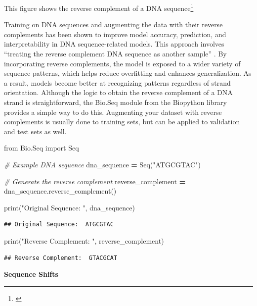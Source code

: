 \documentclass[
]{book}
\newenvironment{Shaded}{\begin{snugshade}}{\end{snugshade}}
\newcommand{\BuiltInTok}[1]{#1}
\newcommand{\CommentTok}[1]{\textcolor[rgb]{0.56,0.35,0.01}{\textit{#1}}}
\newcommand{\ImportTok}[1]{#1}
\newcommand{\NormalTok}[1]{#1}
\newcommand{\OperatorTok}[1]{\textcolor[rgb]{0.81,0.36,0.00}{\textbf{#1}}}
\newcommand{\StringTok}[1]{\textcolor[rgb]{0.31,0.60,0.02}{#1}}
\begin{document}
This figure shows the reverse complement of a DNA sequence\footnote{\citet{clark2021}}

Training on DNA sequences and augmenting the data with their reverse complements has been shown to improve model accuracy, prediction, and interpretability in DNA sequence-related models. This approach involves ``treating the reverse complement DNA sequence as another sample'' \citep{cao2019}. By incorporating reverse complements, the model is exposed to a wider variety of sequence patterns, which helps reduce overfitting and enhances generalization. As a result, models become better at recognizing patterns regardless of strand orientation. Although the logic to obtain the reverse complement of a DNA strand is straightforward, the Bio.Seq module from the Biopython library provides a simple way to do this. Augmenting your dataset with reverse complements is usually done to training sets, but can be applied to validation and test sets as well.

\begin{Shaded}
\begin{Highlighting}[]
\ImportTok{from}\NormalTok{ Bio.Seq }\ImportTok{import}\NormalTok{ Seq}

\CommentTok{\# Example DNA sequence}
\NormalTok{dna\_sequence }\OperatorTok{=}\NormalTok{ Seq(}\StringTok{"ATGCGTAC"}\NormalTok{)}

\CommentTok{\# Generate the reverse complement}
\NormalTok{reverse\_complement }\OperatorTok{=}\NormalTok{ dna\_sequence.reverse\_complement()}

\BuiltInTok{print}\NormalTok{(}\StringTok{"Original Sequence: "}\NormalTok{, dna\_sequence)}
\end{Highlighting}
\end{Shaded}

\begin{verbatim}
## Original Sequence:  ATGCGTAC
\end{verbatim}

\begin{Shaded}
\begin{Highlighting}[]
\BuiltInTok{print}\NormalTok{(}\StringTok{"Reverse Complement: "}\NormalTok{, reverse\_complement)}
\end{Highlighting}
\end{Shaded}

\begin{verbatim}
## Reverse Complement:  GTACGCAT
\end{verbatim}

\textbf{Sequence Shifts}
\end{document}
